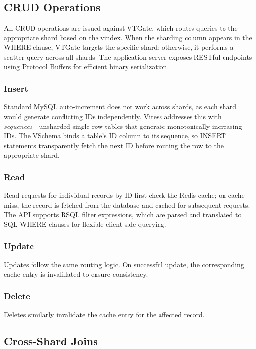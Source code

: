 \documentclass{article}
\begin{document}
\subsection{CRUD Operations}

All CRUD operations are issued against VTGate, which routes queries to the appropriate shard based on the vindex. When the sharding column appears in the WHERE clause, VTGate targets the specific shard; otherwise, it performs a scatter query across all shards. The application server exposes RESTful endpoints using Protocol Buffers for efficient binary serialization.

\subsubsection{Insert}

Standard MySQL auto-increment does not work across shards, as each shard would generate conflicting IDs independently. Vitess addresses this with \emph{sequences}---unsharded single-row tables that generate monotonically increasing IDs. The VSchema binds a table's ID column to its sequence, so INSERT statements transparently fetch the next ID before routing the row to the appropriate shard.

\subsubsection{Read}

Read requests for individual records by ID first check the Redis cache; on cache miss, the record is fetched from the database and cached for subsequent requests. The API supports RSQL filter expressions, which are parsed and translated to SQL WHERE clauses for flexible client-side querying.

\subsubsection{Update}

Updates follow the same routing logic. On successful update, the corresponding cache entry is invalidated to ensure consistency.

\subsubsection{Delete}

Deletes similarly invalidate the cache entry for the affected record.

\subsection{Cross-Shard Joins}
\end{document}
